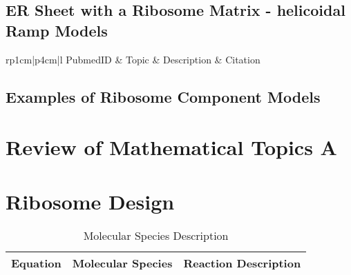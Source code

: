 \subsection{ER Sheet with a Ribosome Matrix - helicoidal Ramp Models}

\centering	
\begin{table}[H]\tiny
	\caption{}	
	\begin{tabular}{rp{1cm}|p{4cm}|l}
		\hline	
		PubmedID & Topic & Description & Citation \\
		\hline 
		\hline 
	\end{tabular}
\end{table}

\subsection{Examples of Ribosome Component Models}

\begin{figure}[H]
	\centering
\begin{minipage}[b]{0.3\linewidth}
	\caption{}
	\label{fig:FigureA}
\end{minipage}\hfill
\begin{minipage}[b]{0.3\linewidth}
	\caption{}
	\label{fig:FigureB}
\end{minipage}\hfill
\begin{minipage}[b]{0.3\linewidth}
	\caption{}
	\label{fig:FigureC}
\end{minipage}\hfill
	\caption{}
	\label{fig:Figure_1}
\end{figure}


\section{Review of Mathematical Topics A}


\section{Ribosome Design}

\begin{table}[H]
\centering
\begin{tabular}{rll}
Equation & Molecular Species & Reaction Description\\ 
\hline
\hline
\end{tabular}
\caption{Molecular Species Description}
\end{table}


